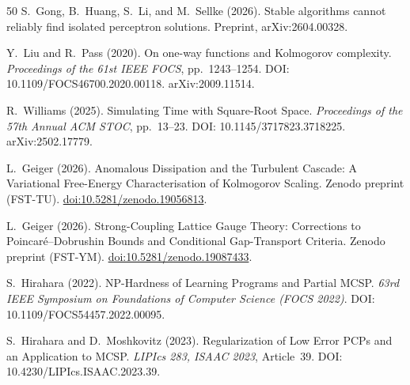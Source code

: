 \documentclass[aps,prd,twocolumn,superscriptaddress,nofootinbib]{revtex4-2}
\theoremstyle{definition}
\theoremstyle{remark}
\begin{document}
\begin{thebibliography}{50}
S.~Gong, B.~Huang, S.~Li, and M.~Sellke (2026).
Stable algorithms cannot reliably find isolated perceptron solutions.
Preprint, arXiv:2604.00328.

Y.~Liu and R.~Pass (2020).
On one-way functions and Kolmogorov complexity.
\textit{Proceedings of the 61st IEEE FOCS}, pp.\ 1243--1254.
DOI: 10.1109/FOCS46700.2020.00118. arXiv:2009.11514.

R.~Williams (2025).
Simulating Time with Square-Root Space.
\textit{Proceedings of the 57th Annual ACM STOC}, pp.\ 13--23.
DOI: 10.1145/3717823.3718225. arXiv:2502.17779.

L.~Geiger (2026).
Anomalous Dissipation and the Turbulent Cascade: A Variational Free-Energy Characterisation of Kolmogorov Scaling.
Zenodo preprint (FST-TU).
\href{https://doi.org/10.5281/zenodo.19056813}{doi:10.5281/zenodo.19056813}.

L.~Geiger (2026).
Strong-Coupling Lattice Gauge Theory: Corrections to Poincar\'e--Dobrushin Bounds and Conditional Gap-Transport Criteria.
Zenodo preprint (FST-YM).
\href{https://doi.org/10.5281/zenodo.19087433}{doi:10.5281/zenodo.19087433}.

S.~Hirahara (2022).
NP-Hardness of Learning Programs and Partial MCSP.
\textit{63rd IEEE Symposium on Foundations of Computer Science (FOCS 2022)}.
DOI: 10.1109/FOCS54457.2022.00095.

S.~Hirahara and D.~Moshkovitz (2023).
Regularization of Low Error PCPs and an Application to MCSP.
\textit{LIPIcs 283, ISAAC 2023}, Article~39.
DOI: 10.4230/LIPIcs.ISAAC.2023.39.

\end{thebibliography}
\end{document}
